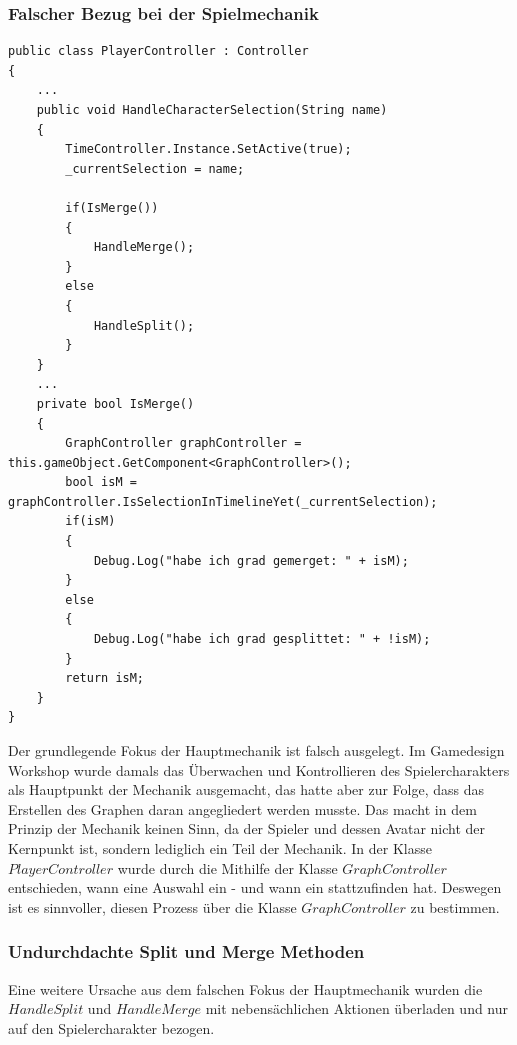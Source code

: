 \subsubsection{Falscher Bezug bei der Spielmechanik}
\begin{lstlisting}[caption={HandleCharacterSelection in der PlayerController.cs Klasse}, label={sec:playercontroller_old}]
public class PlayerController : Controller
{
    ...
    public void HandleCharacterSelection(String name)
    {
        TimeController.Instance.SetActive(true);
        _currentSelection = name;
        
        if(IsMerge())
        {
            HandleMerge();
        }
        else
        {
            HandleSplit();
        }
    }
    ...
    private bool IsMerge()
    {
        GraphController graphController = this.gameObject.GetComponent<GraphController>();
        bool isM = graphController.IsSelectionInTimelineYet(_currentSelection);
        if(isM)
        {   
            Debug.Log("habe ich grad gemerget: " + isM);
        }
        else
        {
            Debug.Log("habe ich grad gesplittet: " + !isM);
        }
        return isM;
    }
}
\end{lstlisting}
Der grundlegende Fokus der Hauptmechanik ist falsch ausgelegt. Im Gamedesign Workshop wurde damals das Überwachen und Kontrollieren des Spielercharakters als Hauptpunkt der Mechanik ausgemacht, das hatte aber zur Folge, dass das Erstellen des Graphen daran angegliedert werden musste. Das macht in dem Prinzip der Mechanik keinen Sinn, da der Spieler und dessen Avatar nicht der Kernpunkt ist, sondern lediglich ein Teil der Mechanik. In der Klasse $PlayerController$ wurde durch die Mithilfe der Klasse $GraphController$ entschieden, wann eine Auswahl ein - und wann ein  stattzufinden hat. Deswegen ist es sinnvoller, diesen Prozess über die Klasse $GraphController$ zu bestimmen.

\subsubsection{Undurchdachte Split und Merge Methoden}\label{sec:bad_merge_split}
Eine weitere Ursache aus dem falschen Fokus der Hauptmechanik wurden die\\ $HandleSplit$ und $HandleMerge$ mit nebensächlichen Aktionen überladen und nur auf den Spielercharakter bezogen.

